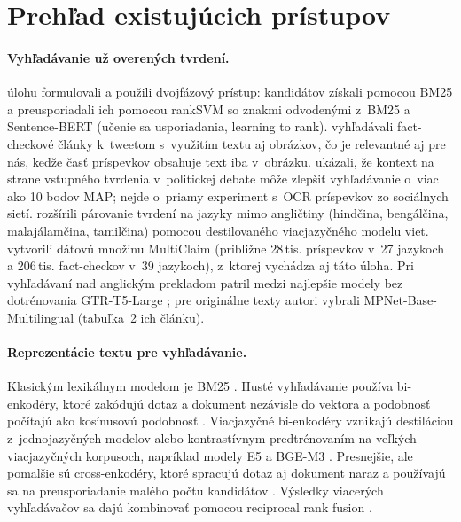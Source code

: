 \documentclass[11pt,a4paper]{article}
\begin{document}
\section{Prehľad existujúcich prístupov}
\label{sec:related}

\paragraph{Vyhľadávanie už overených tvrdení.}
\citet{shaar-etal-2020-known} úlohu formulovali a použili dvojfázový prístup: kandidátov získali pomocou BM25 a preusporiadali ich pomocou rankSVM so znakmi odvodenými z~BM25 a Sentence-BERT (učenie sa usporiadania, learning to rank).
\citet{vo-lee-2020-facts} vyhľadávali fact-checkové články k~tweetom s~využitím textu aj obrázkov, čo je relevantné aj pre nás, keďže časť príspevkov obsahuje text iba v~obrázku.
\citet{shaar-etal-2022-role} ukázali, že kontext na strane vstupného tvrdenia v~politickej debate môže zlepšiť vyhľadávanie o~viac ako 10 bodov MAP; nejde o~priamy experiment s~OCR príspevkov zo sociálnych sietí.
\citet{kazemi-etal-2021-claim} rozšírili párovanie tvrdení na jazyky mimo angličtiny (hindčina, bengálčina, malajálamčina, tamilčina) pomocou destilovaného viacjazyčného modelu viet.
\citet{pikuliak-etal-2023-multilingual} vytvorili dátovú množinu MultiClaim (približne 28\,tis. príspevkov v~27 jazykoch a 206\,tis. fact-checkov v~39 jazykoch), z~ktorej vychádza aj táto úloha.
Pri vyhľadávaní nad anglickým prekladom patril medzi najlepšie modely bez dotrénovania GTR-T5-Large \citep{ni-etal-2022-large}; pre originálne texty autori vybrali MPNet-Base-Multilingual (tabuľka~2 ich článku).

\paragraph{Reprezentácie textu pre vyhľadávanie.}
Klasickým lexikálnym modelom je BM25 \citep{robertson-zaragoza-2009-bm25}.
Husté vyhľadávanie používa bi-enkodéry, ktoré zakódujú dotaz a dokument nezávisle do vektora a podobnosť počítajú ako kosínusovú podobnosť \citep{reimers-gurevych-2019-sentence}.
Viacjazyčné bi-enkodéry vznikajú destiláciou z~jednojazyčných modelov \citep{reimers-gurevych-2020-making} alebo kontrastívnym predtrénovaním na veľkých viacjazyčných korpusoch, napríklad modely E5 \citep{wang-etal-2022-e5, wang-etal-2024-multilingual-e5} a BGE-M3 \citep{chen-etal-2024-m3}.
Presnejšie, ale pomalšie sú cross-enkodéry, ktoré spracujú dotaz aj dokument naraz a používajú sa na preusporiadanie malého počtu kandidátov \citep{nogueira-cho-2019-passage}.
Výsledky viacerých vyhľadávačov sa dajú kombinovať pomocou reciprocal rank fusion \citep{cormack-etal-2009-rrf}.
\end{document}
